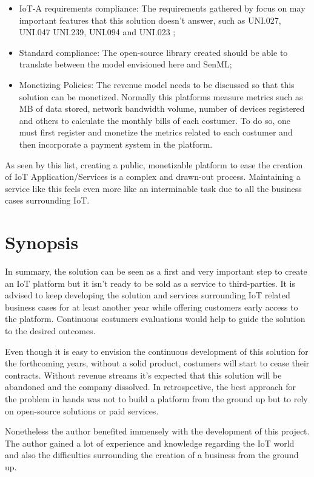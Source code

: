 \begin{itemize}
    \item IoT-A requirements compliance: The requirements gathered by \cite{iot-a} focus on may important features that this solution doesn't answer, such as UNI.027, UNI.047 UNI.239, UNI.094 and UNI.023 \parencite{iot-a};
    \item {} Standard compliance: The open-source library created should be able to translate between the model envisioned here and SenML;
    \item Monetizing Policies: The revenue model needs to be discussed so that this solution can be monetized. Normally this platforms measure metrics such as \gls{MB} of data stored, network bandwidth volume, number of devices registered and others to calculate the monthly bills of each costumer. To do so, one must first register and monetize the metrics related to each costumer and then incorporate a payment system in the platform.
\end{itemize}

As seen by this list, creating a public, monetizable platform to ease the creation of \gls{IoT} Application/Services is a complex and drawn-out process. Maintaining a service like this feels even more like an interminable task due to all the business cases surrounding \gls{IoT}.

\section{Synopsis}
\label{sec:conclusion:synopsis}

In summary, the solution can be seen as a first and very important step to create an \gls{IoT} platform but it isn't ready to be sold as a service to third-parties. It is advised to keep developing the solution and services surrounding \gls{IoT} related business cases for at least another year while offering customers early access to the platform. Continuous costumers evaluations would help to guide the solution to the desired outcomes.

Even though it is easy to envision the continuous development of this solution for the forthcoming years, without a solid product, costumers will start to cease their contracts. Without revenue streams it's expected that this solution will be abandoned and the company dissolved. In retrospective, the best approach for the problem in hands was not to build a platform from the ground up but to rely on open-source solutions or paid services.

Nonetheless the author benefited immensely with the development of this project. The author gained a lot of experience and knowledge regarding the \gls{IoT} world and also the difficulties surrounding the creation of a business from the ground up.
